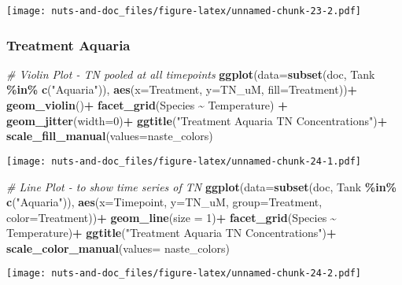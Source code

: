 \documentclass[
]{article}
\newenvironment{Shaded}{\begin{snugshade}}{\end{snugshade}}
\newcommand{\AttributeTok}[1]{\textcolor[rgb]{0.13,0.29,0.53}{#1}}
\newcommand{\CommentTok}[1]{\textcolor[rgb]{0.56,0.35,0.01}{\textit{#1}}}
\newcommand{\DecValTok}[1]{\textcolor[rgb]{0.00,0.00,0.81}{#1}}
\newcommand{\FunctionTok}[1]{\textcolor[rgb]{0.13,0.29,0.53}{\textbf{#1}}}
\newcommand{\NormalTok}[1]{#1}
\newcommand{\SpecialCharTok}[1]{\textcolor[rgb]{0.81,0.36,0.00}{\textbf{#1}}}
\newcommand{\StringTok}[1]{\textcolor[rgb]{0.31,0.60,0.02}{#1}}
\begin{document}
\texttt{[image: nuts-and-doc\_files/figure-latex/unnamed-chunk-23-2.pdf]}

\hypertarget{treatment-aquaria-7}{%
\subsubsection{Treatment Aquaria}\label{treatment-aquaria-7}}

\begin{Shaded}
\begin{Highlighting}[]
\CommentTok{\# Violin Plot {-} TN pooled at all timepoints}
\FunctionTok{ggplot}\NormalTok{(}\AttributeTok{data=}\FunctionTok{subset}\NormalTok{(doc, Tank }\SpecialCharTok{\%in\%} \FunctionTok{c}\NormalTok{(}\StringTok{"Aquaria"}\NormalTok{)), }\FunctionTok{aes}\NormalTok{(}\AttributeTok{x=}\NormalTok{Treatment, }\AttributeTok{y=}\NormalTok{TN\_uM, }\AttributeTok{fill=}\NormalTok{Treatment))}\SpecialCharTok{+}
  \FunctionTok{geom\_violin}\NormalTok{()}\SpecialCharTok{+}
  \FunctionTok{facet\_grid}\NormalTok{(Species }\SpecialCharTok{\textasciitilde{}}\NormalTok{ Temperature) }\SpecialCharTok{+}
  \FunctionTok{geom\_jitter}\NormalTok{(}\AttributeTok{width=}\DecValTok{0}\NormalTok{)}\SpecialCharTok{+}
  \FunctionTok{ggtitle}\NormalTok{(}\StringTok{"Treatment Aquaria TN Concentrations"}\NormalTok{)}\SpecialCharTok{+}
  \FunctionTok{scale\_fill\_manual}\NormalTok{(}\AttributeTok{values=}\NormalTok{naste\_colors)}
\end{Highlighting}
\end{Shaded}

\texttt{[image: nuts-and-doc\_files/figure-latex/unnamed-chunk-24-1.pdf]}

\begin{Shaded}
\begin{Highlighting}[]
\CommentTok{\# Line Plot {-} to show time series of TN}
\FunctionTok{ggplot}\NormalTok{(}\AttributeTok{data=}\FunctionTok{subset}\NormalTok{(doc, Tank }\SpecialCharTok{\%in\%} \FunctionTok{c}\NormalTok{(}\StringTok{"Aquaria"}\NormalTok{)), }\FunctionTok{aes}\NormalTok{(}\AttributeTok{x=}\NormalTok{Timepoint, }\AttributeTok{y=}\NormalTok{TN\_uM, }\AttributeTok{group=}\NormalTok{Treatment, }\AttributeTok{color=}\NormalTok{Treatment))}\SpecialCharTok{+}
  \FunctionTok{geom\_line}\NormalTok{(}\AttributeTok{size =} \DecValTok{1}\NormalTok{)}\SpecialCharTok{+}
  \FunctionTok{facet\_grid}\NormalTok{(Species }\SpecialCharTok{\textasciitilde{}}\NormalTok{ Temperature)}\SpecialCharTok{+}
  \FunctionTok{ggtitle}\NormalTok{(}\StringTok{"Treatment Aquaria TN Concentrations"}\NormalTok{)}\SpecialCharTok{+}
  \FunctionTok{scale\_color\_manual}\NormalTok{(}\AttributeTok{values=}\NormalTok{ naste\_colors)}
\end{Highlighting}
\end{Shaded}

\texttt{[image: nuts-and-doc\_files/figure-latex/unnamed-chunk-24-2.pdf]}
\end{document}
